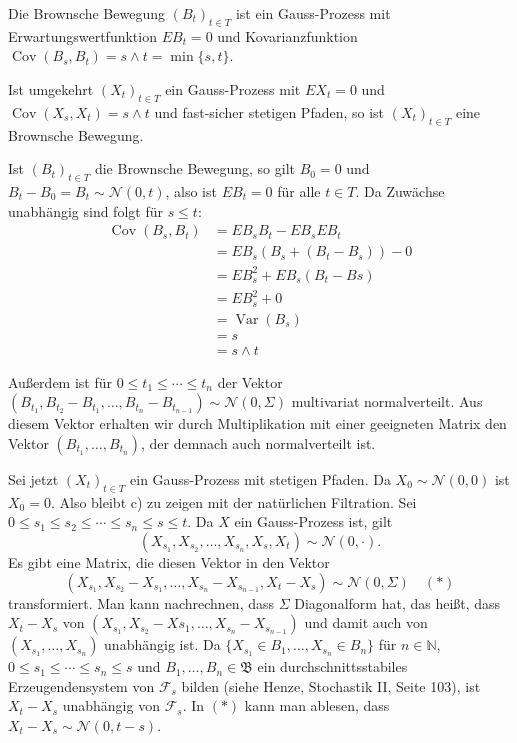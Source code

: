 \documentclass[a4paper,twoside,DIV15,BCOR12mm]{scrbook}
\newcommand{\cF}{\mathcal F}
\newcommand{\borel}{{\mathfrak B}}
\begin{document}
\begin{satz}
\label{satz:9.2}
Die Brownsche Bewegung $(B_t)_{t\in T}$ ist ein Gauss-Prozess mit Erwartungswertfunktion $EB_t =0$ und Kovarianzfunktion $\operatorname{Cov}(B_s,B_t)=s\wedge t = \min\{s,t\}$.

Ist umgekehrt $(X_t)_{t\in T}$ ein Gauss-Prozess mit $EX_t=0$ und $\operatorname{Cov}(X_s,X_t)=s\wedge t$ und fast-sicher stetigen Pfaden, so ist $(X_t)_{t\in T}$ eine Brownsche Bewegung.
\end{satz}

\begin{beweis}
Ist $(B_t)_{t\in T}$ die Brownsche Bewegung, so gilt $B_0=0$ und $B_t-B_0=B_t\sim \mathcal N(0,t)$, also ist $EB_t=0$ für alle $t\in T$. Da Zuwächse unabhängig sind folgt für $s\le t$:
\begin{align*}
\operatorname{Cov}(B_s,B_t) &= EB_sB_t - EB_sEB_t\\
&= EB_s(B_s + (B_t-B_s)) - 0\\
&= EB_s^2 + EB_s(B_t-Bs) \\
&= EB_s^2 + 0 \\
&= \operatorname{Var}(B_s)  \\
&= s \\
&= s\wedge t
\end{align*}

Außerdem ist für $0\le t_1\le\cdots\le t_n$ der Vektor $(B_{t_1},B_{t_2}-B_{t_1},\ldots,B_{t_n}-B_{t_{n-1}})\sim \mathcal N(0,\Sigma)$ multivariat normalverteilt. Aus diesem Vektor erhalten wir durch Multiplikation mit einer geeigneten Matrix den Vektor $(B_{t_1},\ldots,B_{t_n})$, der demnach auch normalverteilt ist.

Sei jetzt $(X_t)_{t\in T}$ ein Gauss-Prozess mit stetigen Pfaden. Da $X_0\sim \mathcal N(0,0)$ ist $X_0=0$. Also bleibt c) zu zeigen mit der natürlichen Filtration. Sei $0\le s_1\le s_2\le \cdots \le s_n\le s \le t$. Da $X$ ein Gauss-Prozess ist, gilt 
\[
(X_{s_1},X_{s_2},\ldots,X_{s_n},X_s,X_t)\sim \mathcal N(0,\cdot).
\]
Es gibt eine Matrix, die diesen Vektor in den Vektor 
\[
(X_{s_1},X_{s_2}-X_{s_1},\ldots,X_{s_n}-X_{s_{n-1}},X_t-X_s)\sim\mathcal N(0,\Sigma) \quad (*)
\]
transformiert. Man kann nachrechnen, dass $\Sigma$ Diagonalform hat, das heißt, dass $X_t -X_s$ von $(X_{s_1},X_{s_2}-X{s_1},\ldots,X_{s_n}-X_{s_{n-1}})$ und damit auch von $(X_{s_1},\ldots,X_{s_n})$ unabhängig ist. Da $\{X_{s_1}\in B_1,\ldots,X_{s_n}\in B_n\}$ für $n\in \mathbb N$, $0\le s_1\le \cdots\le s_n\le s$ und $B_1,\ldots,B_n\in \borel$ ein durchschnittsstabiles Erzeugendensystem von $\cF_s$ bilden (siehe Henze, Stochastik II, Seite 103), ist $X_t-X_s$ unabhängig von $\cF_s$. In $(*)$ kann man ablesen, dass $X_t-X_s\sim \mathcal N(0,t-s)$.
\end{beweis}
\end{document}
